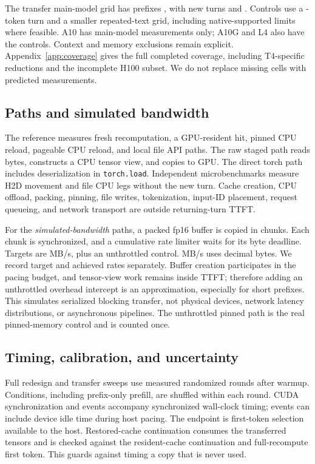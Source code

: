 \documentclass[10pt]{article}
\begin{document}
The transfer main-model grid has prefixes , with new turns  and . Controls use a -token turn and a smaller repeated-text grid, including native-supported limits where feasible. A10 has main-model measurements only; A10G and L4 also have the controls. Context and memory exclusions remain explicit. Appendix~\ref{app:coverage} gives the full completed coverage, including T4-specific reductions and the incomplete H100 subset. We do not replace missing cells with predicted measurements.

\subsection{Paths and simulated bandwidth}
The reference measures fresh recomputation, a GPU-resident hit, pinned CPU reload, pageable CPU reload, and local file API paths. The raw staged path reads bytes, constructs a CPU tensor view, and copies to GPU. The direct torch path includes deserialization in \texttt{torch.load}. Independent microbenchmarks measure H2D movement and file CPU legs without the new turn. Cache creation, CPU offload, packing, pinning, file writes, tokenization, input-ID placement, request queueing, and network transport are outside returning-turn TTFT.

For the \emph{simulated-bandwidth} paths, a packed fp16 buffer is copied in chunks. Each chunk is synchronized, and a cumulative rate limiter waits for its byte deadline. Targets are  MB/s, plus an unthrottled control. MB/s uses decimal bytes. We record target and achieved rates separately. Buffer creation participates in the pacing budget, and tensor-view work remains inside TTFT; therefore adding an unthrottled overhead intercept is an approximation, especially for short prefixes. This simulates serialized blocking transfer, not physical devices, network latency distributions, or asynchronous pipelines. The unthrottled pinned path is the real pinned-memory control and is counted once.

\subsection{Timing, calibration, and uncertainty}
Full redesign and transfer sweeps use  measured randomized rounds after warmup. Conditions, including prefix-only prefill, are shuffled within each round. CUDA synchronization and events accompany synchronized wall-clock timing; events can include device idle time during host pacing. The endpoint is first-token selection available to the host. Restored-cache continuation consumes the transferred tensors and is checked against the resident-cache continuation and full-recompute first token. This guards against timing a copy that is never used.
\end{document}

